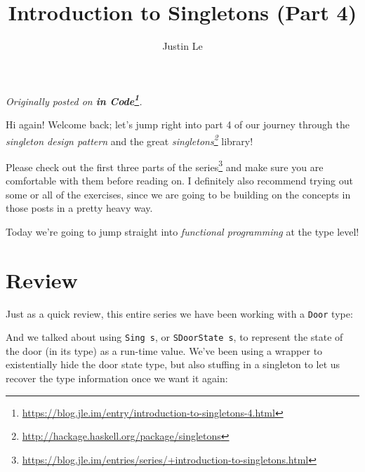 \documentclass[]{article}
\title{Introduction to Singletons (Part 4)}
\author{Justin Le}
\newenvironment{Shaded}{}{}
\newcommand{\CommentTok}[1]{\textcolor[rgb]{0.38,0.63,0.69}{\textit{#1}}}
\newcommand{\DataTypeTok}[1]{\textcolor[rgb]{0.56,0.13,0.00}{#1}}
\newcommand{\FunctionTok}[1]{\textcolor[rgb]{0.02,0.16,0.49}{#1}}
\newcommand{\KeywordTok}[1]{\textcolor[rgb]{0.00,0.44,0.13}{\textbf{#1}}}
\newcommand{\NormalTok}[1]{#1}
\newcommand{\OtherTok}[1]{\textcolor[rgb]{0.00,0.44,0.13}{#1}}
\renewcommand{\href}[2]{#2\footnote{\url{#1}}}
\begin{document}
\maketitle

\emph{Originally posted on
\textbf{\href{https://blog.jle.im/entry/introduction-to-singletons-4.html}{in
Code}}.}

Hi again! Welcome back; let's jump right into part 4 of our journey through the
\emph{singleton design pattern} and the great
\emph{\href{http://hackage.haskell.org/package/singletons}{singletons}} library!

Please check out
\href{https://blog.jle.im/entries/series/+introduction-to-singletons.html}{the
first three parts of the series} and make sure you are comfortable with them
before reading on. I definitely also recommend trying out some or all of the
exercises, since we are going to be building on the concepts in those posts in a
pretty heavy way.

Today we're going to jump straight into \emph{functional programming} at the
type level!

\hypertarget{review}{%
\section{Review}\label{review}}

Just as a quick review, this entire series we have been working with a
\texttt{Door} type:

\begin{Shaded}
\end{Shaded}

And we talked about using \texttt{Sing\ s}, or \texttt{SDoorState\ s}, to
represent the state of the door (in its type) as a run-time value. We've been
using a wrapper to existentially hide the door state type, but also stuffing in
a singleton to let us recover the type information once we want it again:
\end{document}
